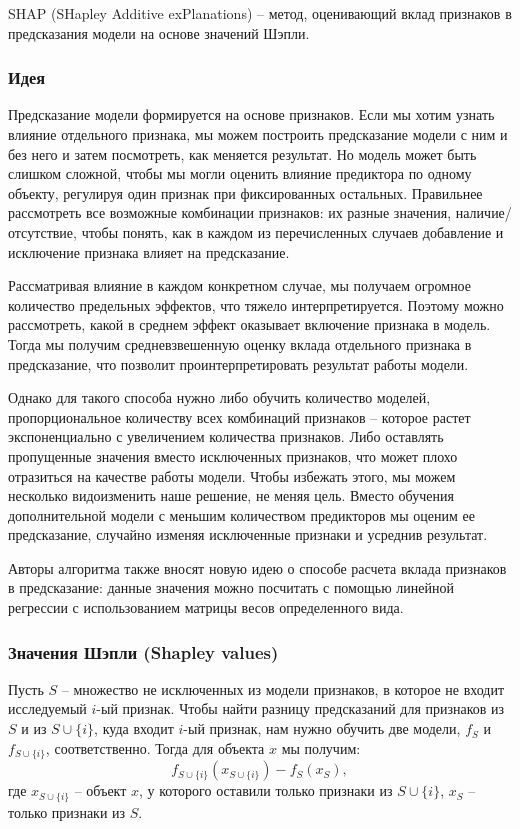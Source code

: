 SHAP (SHapley Additive exPlanations) -- метод, оценивающий вклад признаков в предсказания модели на основе значений Шэпли.

\subsubsection{Идея}
Предсказание модели формируется на основе признаков. Если мы хотим узнать влияние отдельного признака, мы можем построить предсказание модели с ним и без него и затем посмотреть, как меняется результат. %
Но модель может быть слишком сложной, чтобы мы могли оценить влияние предиктора по одному объекту, регулируя один признак при фиксированных остальных. Правильнее рассмотреть все возможные комбинации признаков: их разные значения, наличие/отсутствие, чтобы понять, как в каждом из перечисленных случаев добавление и исключение признака влияет на предсказание.

Рассматривая влияние в каждом конкретном случае, мы получаем огромное количество предельных эффектов, что тяжело интерпретируется. Поэтому можно рассмотреть, какой в среднем эффект оказывает включение признака в модель. Тогда мы получим средневзвешенную оценку вклада отдельного признака в предсказание, что позволит проинтерпретировать результат работы модели.

Однако для такого способа нужно либо обучить количество моделей, пропорциональное количеству всех комбинаций признаков -- которое растет экспоненциально с увеличением количества признаков. Либо оставлять пропущенные значения вместо исключенных признаков, что может плохо отразиться на качестве работы модели. Чтобы избежать этого, мы можем несколько видоизменить наше решение, не меняя цель. Вместо обучения дополнительной модели с меньшим количеством предикторов мы оценим ее предсказание, случайно изменяя исключенные признаки и усреднив результат.

Авторы алгоритма также вносят новую идею о способе расчета вклада признаков в предсказание: данные значения можно посчитать с помощью линейной регрессии с использованием матрицы весов определенного вида.

\subsubsection{Значения Шэпли (Shapley values)}
Пусть $S$ -- множество не исключенных из модели признаков, в которое не входит исследуемый $i$-ый признак. Чтобы найти разницу предсказаний для признаков из $S$ и из $S \cup \{i\}$, куда входит $i$-ый признак, нам нужно обучить две модели, $f_S$ и $f_{S \cup \{i\}}$, соответственно. Тогда для объекта $x$ мы получим:
\[
f_{S \cup \{i\}}(x_{S \cup \{i\}}) - f_S(x_S),
\]
где $x_{S \cup \{i\}}$ -- объект $x$, у которого оставили только признаки из $S \cup \{i\}$, $x_S$ -- только признаки из $S$.

